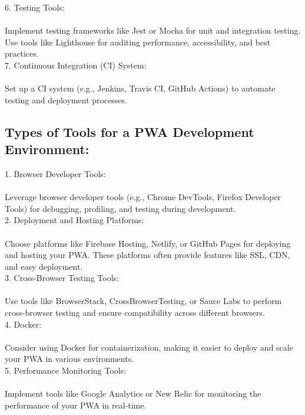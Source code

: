 \documentclass[journal]{IEEEtran}
\begin{document}
6. Testing Tools:\\
   \\Implement testing frameworks like Jest or Mocha for unit and integration testing. Use tools like Lighthouse for auditing performance, accessibility, and best practices.\\

7. Continuous Integration (CI) System:\\
   \\Set up a CI system (e.g., Jenkins, Travis CI, GitHub Actions) to automate testing and deployment processes.\\

\subsection{Types of Tools for a PWA Development Environment:}

1. Browser Developer Tools:\\
   \\Leverage browser developer tools (e.g., Chrome DevTools, Firefox Developer Tools) for debugging, profiling, and testing during development.\\

2. Deployment and Hosting Platforms:\\
   \\Choose platforms like Firebase Hosting, Netlify, or GitHub Pages for deploying and hosting your PWA. These platforms often provide features like SSL, CDN, and easy deployment.\\

3. Cross-Browser Testing Tools:\\
   \\Use tools like BrowserStack, CrossBrowserTesting, or Sauce Labs to perform cross-browser testing and ensure compatibility across different browsers.\\

4. Docker:\\
   \\Consider using Docker for containerization, making it easier to deploy and scale your PWA in various environments.\\

5. Performance Monitoring Tools:\\
   \\Implement tools like Google Analytics or New Relic for monitoring the performance of your PWA in real-time.\\
\end{document}
